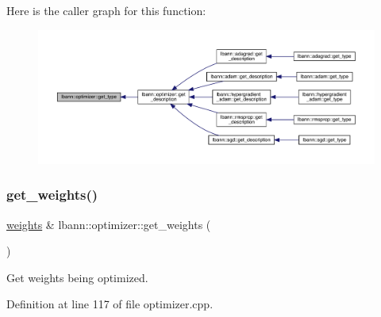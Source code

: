 Here is the caller graph for this function\+:\nopagebreak
\begin{figure}[H]
\begin{center}
\leavevmode
\includegraphics[width=350pt]{classlbann_1_1optimizer_a7b7a6814e14eeee157e1cbb7f15dd4ff_icgraph}
\end{center}
\end{figure}
\mbox{\label{classlbann_1_1optimizer_a9c3fc3f1d45da822676d5932a1c7af82}} 
\subsubsection{\texorpdfstring{get\+\_\+weights()}{get\_weights()}}
{\footnotesize\ttfamily \hyperlink{classlbann_1_1weights}{weights} \& lbann\+::optimizer\+::get\+\_\+weights (\begin{DoxyParamCaption}{ }\end{DoxyParamCaption})}

Get weights being optimized. 

Definition at line 117 of file optimizer.\+cpp.


